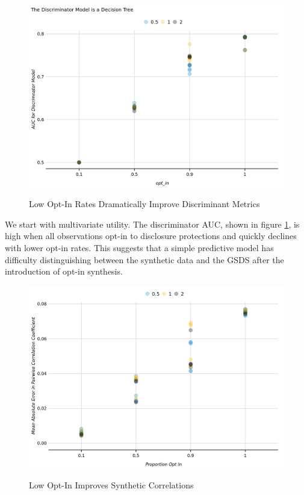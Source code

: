 \documentclass[
]{urban-formatting}
\begin{document}
\begin{figure}[!htb]
    \caption{Low Opt-In Rates Dramatically Improve Discriminant Metrics}
    \centering
    \includegraphics[width=6.5in]{../analysis/figures/discriminator-auc-1.png}
    \label{fig:discriminator}
\end{figure}

We start with multivariate utility. The discriminator AUC, shown in
figure \ref{fig:discriminator}, is high when all observations opt-in to
disclosure protections and quickly declines with lower opt-in rates.
This suggests that a simple predictive model has difficulty
distinguishing between the synthetic data and the GSDS after the
introduction of opt-in synthesis.

\begin{figure}[!htb]
    \caption{Low Opt-In Improves Synthetic Correlations}
    \centering
    \includegraphics[width=6.5in]{../analysis/figures/correlation-difference-1.png}
    \label{fig:correlation-difference}
\end{figure}
\end{document}
